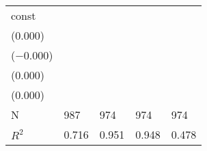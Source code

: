 \begin{tabular}{lllll}
const                      &    \makecell{$0.126^{***}$ \\ ($0.000$)} &   \makecell{$-0.003^{}$ \\ ($-0.000$)} &     \makecell{$0.025^{}$ \\ ($0.000$)} &     \makecell{$0.240^{***}$ \\ ($0.000$)} \\
\midrule N                 &                                      987 &                                    974 &                                    974 &                                       974 \\
$R^2$                      &                                    0.716 &                                  0.951 &                                  0.948 &                                     0.478 \\
\bottomrule
\end{tabular}
